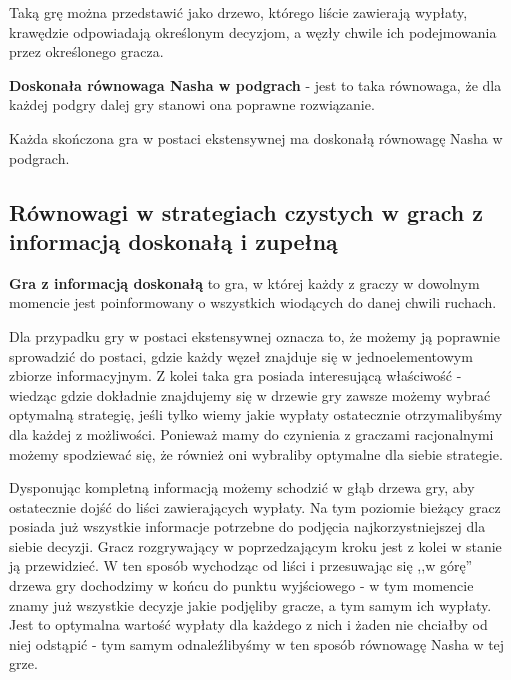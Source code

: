 \documentclass[polish]{standalone}
\begin{document}
Taką grę można przedstawić jako drzewo, którego liście zawierają wypłaty, krawędzie odpowiadają określonym decyzjom,
a węzły chwile ich podejmowania przez określonego gracza. 

\begin{definition}
\textbf{Doskonała równowaga Nasha w podgrach} - jest to taka równowaga, że dla każdej podgry dalej gry stanowi ona
poprawne rozwiązanie.
\end{definition}

\begin{theorem}
Każda skończona gra w postaci ekstensywnej ma doskonałą równowagę Nasha w podgrach.
\end{theorem}

\subsection{Równowagi w strategiach czystych w grach z informacją doskonałą i zupełną}

\begin{definition}
\textbf{Gra z informacją doskonałą} to gra, w której każdy z graczy w dowolnym momencie jest poinformowany o wszystkich
wiodących do danej chwili ruchach.
\end{definition}

Dla przypadku gry w postaci ekstensywnej oznacza to, że możemy ją poprawnie sprowadzić do postaci, gdzie każdy węzeł
znajduje się w jednoelementowym zbiorze informacyjnym. Z kolei taka gra posiada interesującą właściwość - wiedząc gdzie
dokładnie znajdujemy się w drzewie gry zawsze możemy wybrać optymalną strategię, jeśli tylko wiemy jakie wypłaty
ostatecznie otrzymalibyśmy dla każdej z możliwości. Ponieważ mamy do czynienia z graczami racjonalnymi możemy spodziewać
się, że również oni wybraliby optymalne dla siebie strategie.

Dysponując kompletną informacją możemy schodzić w głąb drzewa gry, aby ostatecznie dojść do liści zawierających wypłaty.
Na tym poziomie bieżący gracz posiada już wszystkie informacje potrzebne do podjęcia najkorzystniejszej dla siebie
decyzji. Gracz rozgrywający w poprzedzającym kroku jest z kolei w stanie ją przewidzieć. W ten sposób wychodząc od liści
i przesuwając się ,,w górę'' drzewa gry dochodzimy w końcu do punktu wyjściowego - w tym momencie znamy już wszystkie
decyzje jakie podjęliby gracze, a tym samym ich wypłaty. Jest to optymalna wartość wypłaty dla każdego z nich i żaden
nie chciałby od niej odstąpić - tym samym odnaleźlibyśmy w ten sposób równowagę Nasha w tej grze.
\end{document}
